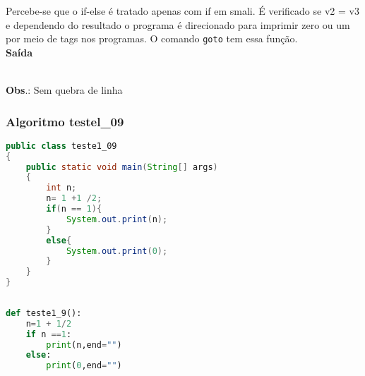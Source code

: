 \documentclass[hidelinks,12pt]{article}
\begin{document}
	Percebe-se que o if-else é tratado apenas com if em smali. É verificado se v2 = v3 e dependendo do resultado o programa é direcionado para imprimir zero ou um por meio de tags nos programas. O comando \texttt{goto} tem essa função.\\
	
	{\large{\textbf{Saída}}}
	
	\noindent{}\\	
	
	\textbf{Obs}.: Sem quebra de linha\\	
	\subsubsection{Algoritmo testel\_09}
	
	\begin{lstlisting}[caption=Código em Java,language=java]
public class teste1_09
{
	public static void main(String[] args)
	{
		int n;
		n= 1 +1 /2;
		if(n == 1){
			System.out.print(n);
		}
		else{
			System.out.print(0);
		}
	}
}	
	
	\end{lstlisting}
	
	\begin{lstlisting}[caption=Código em python,language=Python]
def teste1_9():
	n=1 + 1/2
	if n ==1:
		print(n,end="")
	else:
		print(0,end="")
	
	
	\end{lstlisting}
	
\end{document}
